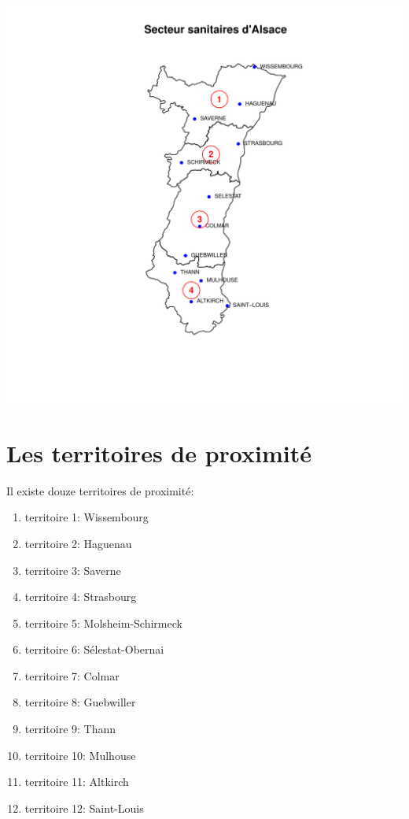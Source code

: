 \documentclass[12pt,english,french,twoside]{report}\usepackage[]{graphicx}\usepackage[]{color}
\makeatletter
\def\maxwidth{ %
  \ifdim\Gin@nat@width>\linewidth
    \linewidth
  \else
    \Gin@nat@width
  \fi
}
\newenvironment{knitrout}{}{} %
\makeatother
\begin{document}
\begin{knitrout}
\color{fgcolor}
\includegraphics[width=\maxwidth]{figure/carte_secteurs_sanitaires} 

\end{knitrout}



\section{Les territoires de proximité}

Il existe douze territoires de proximité:
\begin{enumerate}
  \item territoire 1: Wissembourg
  \item territoire 2: Haguenau
  \item territoire 3: Saverne
  \item territoire 4: Strasbourg
  \item territoire 5: Molsheim-Schirmeck
  \item territoire 6: Sélestat-Obernai
  \item territoire 7: Colmar
  \item territoire 8: Guebwiller
  \item territoire 9: Thann
  \item territoire 10: Mulhouse
  \item territoire 11: Altkirch
  \item territoire 12: Saint-Louis
\end{enumerate}
\end{document}
